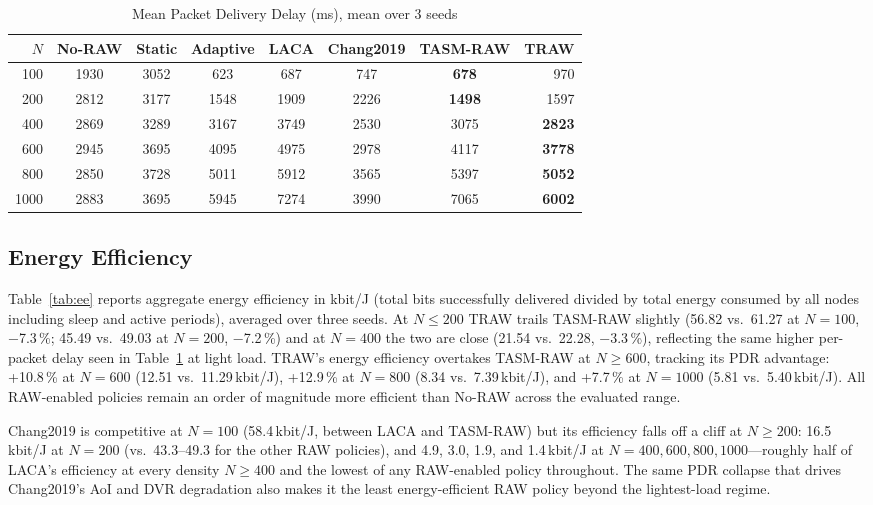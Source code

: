 \documentclass[journal]{IEEEtran}
\begin{document}
\begin{table}[!t]
\renewcommand{\arraystretch}{1.15}
\caption{Mean Packet Delivery Delay (ms), mean over 3 seeds}
\label{tab:delay}
\centering
\setlength{\tabcolsep}{3.5pt}
\begin{tabular}{@{}rccccccr@{}}
\toprule
$N$ & No-RAW & Static & Adaptive & LACA & Chang2019 & TASM-RAW & \textbf{TRAW} \\
\midrule
 100 &  1930 &  3052 &   623 &   687 &   747 &   \textbf{678} &  970 \\
 200 &  2812 &  3177 &  1548 &  1909 &  2226 &  \textbf{1498} & 1597 \\
 400 &  2869 &  3289 &  3167 &  3749 &  2530 & 3075 & \textbf{2823} \\
 600 &  2945 &  3695 &  4095 &  4975 &  2978 & 4117 & \textbf{3778} \\
 800 &  2850 &  3728 &  5011 &  5912 &  3565 & 5397 & \textbf{5052} \\
1000 &  2883 &  3695 &  5945 &  7274 &  3990 & 7065 & \textbf{6002} \\
\bottomrule
\end{tabular}
\end{table}

\subsection{Energy Efficiency}

Table~\ref{tab:ee} reports aggregate energy efficiency in kbit/J
(total bits successfully delivered divided by total energy consumed
by all nodes including sleep and active periods), averaged over three
seeds.
At $N\!\leq\!200$ TRAW trails TASM-RAW slightly (56.82 vs.\ 61.27 at
$N\!=\!100$, −7.3\,\%; 45.49 vs.\ 49.03 at $N\!=\!200$, −7.2\,\%) and at
$N\!=\!400$ the two are close (21.54 vs.\ 22.28, −3.3\,\%), reflecting
the same higher per-packet delay seen in Table~\ref{tab:delay} at light
load.
TRAW's energy efficiency overtakes TASM-RAW at $N\!\geq\!600$, tracking
its PDR advantage: +10.8\,\% at $N\!=\!600$ (12.51 vs.\ 11.29\,kbit/J),
+12.9\,\% at $N\!=\!800$ (8.34 vs.\ 7.39\,kbit/J), and +7.7\,\% at
$N\!=\!1000$ (5.81 vs.\ 5.40\,kbit/J).
All RAW-enabled policies remain an order of magnitude more efficient
than No-RAW across the evaluated range.

Chang2019 is competitive at $N\!=\!100$ (58.4\,kbit/J, between LACA and
TASM-RAW) but its efficiency falls off a cliff at $N\!\geq\!200$:
16.5\,kbit/J at $N\!=\!200$ (vs.\ 43.3--49.3 for the other RAW
policies), and 4.9, 3.0, 1.9, and 1.4\,kbit/J at
$N\!=\!400,600,800,1000$---roughly half of LACA's efficiency at every
density $N\!\geq\!400$ and the lowest of any RAW-enabled policy
throughout. The same PDR collapse that drives Chang2019's AoI and DVR
degradation also makes it the least energy-efficient RAW policy beyond
the lightest-load regime.
\end{document}
